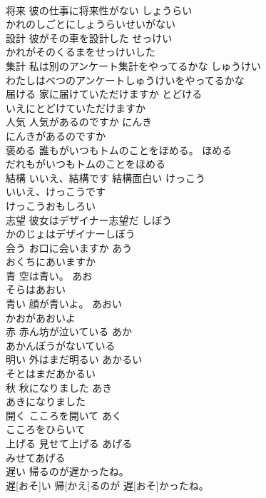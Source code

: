 \documentclass[8pt]{extreport}
\begin{document}
\begin{CJK}{UTF8}{min}
\\	将来 彼の仕事に将来性がない	しょうらい 
\\	かれのしごとにしょうらいせいがない 
\\	設計 彼がその車を設計した	せっけい　
\\	かれがそのくるまをせっけいした 
\\	集計 私は別のアンケート集計をやってるかな	しゅうけい 
\\	わたしはべつのアンケートしゅうけいをやってるかな 
\\	届ける 家に届けていただけますか	とどける 
\\	いえにとどけていただけますか 
\\	人気 人気があるのですか	にんき 
\\	にんきがあるのですか 
\\	褒める 誰もがいつもトムのことをほめる。	ほめる 
\\	だれもがいつもトムのことをほめる 
\\	結構 いいえ、結構です 結構面白い	けっこう 
\\	いいえ、けっこうです 
\\	けっこうおもしろい 
\\	志望 彼女はデザイナー志望だ	しぼう 
\\	かのじょはデザイナーしぼう 
\\	会う お口に会いますか	あう 
\\	おくちにあいますか 
\\	青 空は青い。	あお 
\\	そらはあおい 
\\	青い 顔が青いよ。	あおい 
\\	かおがあおいよ 
\\	赤 赤ん坊が泣いている	あか 
\\	あかんぼうがないている 
\\	明い 外はまだ明るい	あかるい 
\\	そとはまだあかるい 
\\	秋 秋になりました	あき 
\\	あきになりました 
\\	開く こころを開いて	あく 
\\	こころをひらいて 
\\	上げる 見せて上げる	あげる 
\\	みせてあげる 
\\	遅い 帰るのが遅かったね。	
\\	遅[おそ]い 帰[かえ]るのが 遅[おそ]かったね。

\end{CJK}
\end{document}
